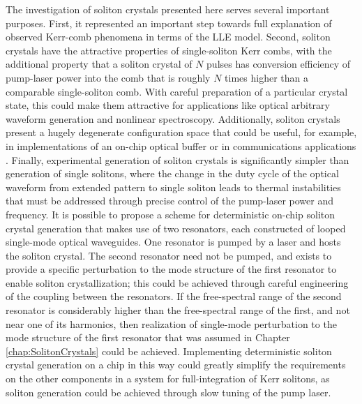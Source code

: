 The investigation of soliton crystals presented here serves several important purposes. First, it represented an important step towards full explanation of observed Kerr-comb phenomena in terms of the LLE model. Second, soliton crystals have the attractive properties of single-soliton Kerr combs, with the additional property that a soliton crystal of $N$ pulses has conversion efficiency of pump-laser power into the comb that is roughly $N$ times higher than a comparable single-soliton comb. With careful preparation of a particular crystal state, this could make them attractive for applications like optical arbitrary waveform generation and nonlinear spectroscopy. Additionally, soliton crystals present a hugely degenerate configuration space that could be useful, for example, in implementations of an on-chip optical buffer or in communications applications \cite{Leo2010a}. Finally, experimental generation of soliton crystals is significantly simpler than generation of single solitons, where the change in the duty cycle of the optical waveform from extended pattern to single soliton leads to thermal instabilities that must be addressed through precise control of the pump-laser power and frequency. It is possible to propose a scheme for deterministic on-chip soliton crystal generation that makes use of two resonators, each constructed of looped single-mode optical waveguides. One resonator is pumped by a laser and hosts the soliton crystal. The second resonator need not be pumped, and exists to provide a specific perturbation to the mode structure of the first resonator to enable soliton crystallization; this could be achieved through careful engineering of the coupling between the resonators. If the free-spectral range of the second resonator is considerably higher than the free-spectral range of the first, and not near one of its harmonics, then realization of single-mode perturbation to the mode structure of the first resonator that was assumed in Chapter \ref{chap:SolitonCrystals} could be achieved. Implementing deterministic soliton crystal generation on a chip in this way could greatly simplify the requirements on the other components in a system for full-integration of Kerr solitons, as soliton generation could be achieved through slow tuning of the pump laser.

